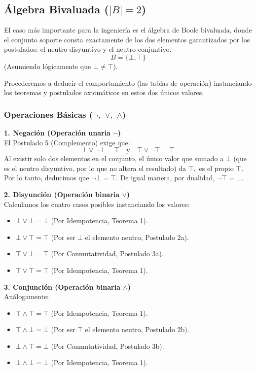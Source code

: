 \subsection{Álgebra Bivaluada ($|B| = 2$)}
El caso más importante para la ingeniería es el álgebra de Boole bivaluada, donde el conjunto soporte consta exactamente de los dos elementos garantizados por los postulados: el neutro disyuntivo y el neutro conjuntivo. 
\[ B = \{ \bot, \top \} \]
(Asumiendo lógicamente que $\bot \neq \top$).

Procederemos a deducir el comportamiento (las tablas de operación) instanciando los teoremas y postulados axiomáticos en estos dos únicos valores.

\subsubsection{Operaciones Básicas ($\neg,$ $\vee,$ $\wedge$)}

\textbf{1. Negación (Operación unaria $\neg$)} \\
El Postulado 5 (Complemento) exige que:
\[ \bot \vee \neg \bot = \top \quad \text{y} \quad \top \vee \neg \top = \top \]
Al existir solo dos elementos en el conjunto, el único valor que sumado a $\bot$ (que es el neutro disyuntivo, por lo que no altera el resultado) da $\top,$ es el propio $\top.$ Por lo tanto, deducimos que $\neg \bot = \top.$ De igual manera, por dualidad, $\neg \top = \bot.$

\textbf{2. Disyunción (Operación binaria $\vee$)} \\
Calculamos los cuatro casos posibles instanciando los valores:
\begin{itemize}
    \item $\bot \vee \bot = \bot$ (Por Idempotencia, Teorema 1).
    \item $\bot \vee \top = \top$ (Por ser $\bot$ el elemento neutro, Postulado 2a).
    \item $\top \vee \bot = \top$ (Por Conmutatividad, Postulado 3a).
    \item $\top \vee \top = \top$ (Por Idempotencia, Teorema 1).
\end{itemize}

\textbf{3. Conjunción (Operación binaria $\wedge$)} \\
Análogamente:
\begin{itemize}
    \item $\top \wedge \top = \top$ (Por Idempotencia, Teorema 1).
    \item $\top \wedge \bot = \bot$ (Por ser $\top$ el elemento neutro, Postulado 2b).
    \item $\bot \wedge \top = \bot$ (Por Conmutatividad, Postulado 3b).
    \item $\bot \wedge \bot = \bot$ (Por Idempotencia, Teorema 1).
\end{itemize}


